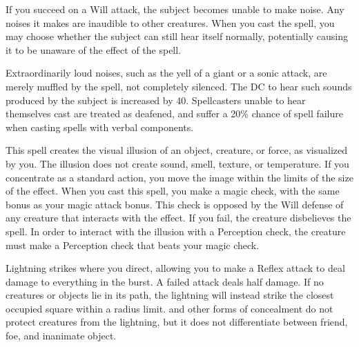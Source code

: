 \spelldur{\durshort \dismissable}
\spelleffect If you succeed on a Will attack, the subject becomes unable to make noise. Any noises it makes are inaudible to other creatures. When you cast the spell, you may choose whether the subject can still hear itself normally, potentially causing it to be unaware of the effect of the spell.

Extraordinarily loud noises, such as the yell of a giant or a sonic attack, are merely muffled by the spell, not completely silenced. The DC to hear such sounds produced by the subject is increased by 40.
\spellnotes Spellcasters unable to hear themselves cast are treated as deafened, and suffer a 20\% chance of spell failure when casting spells with verbal components.

\spelldur{\durshort}
\spelleffect This spell creates the visual illusion of an object, creature, or force, as visualized by you. The illusion does not create sound, smell, texture, or temperature. If you concentrate as a standard action, you move the image within the limits of the size of the effect.
\spellnotes When you cast this spell, you make a magic check, with the same bonus as your magic attack bonus. This check is opposed by the Will defense of any creature that interacts with the effect. If you fail, the creature disbelieves the spell. In order to interact with the illusion with a Perception check, the creature must make a Perception check that beats your magic check.

\spelleffect Lightning strikes where you direct, allowing you to make a Reflex attack to deal damage to everything in the burst. A failed attack deals half damage. If no creatures or objects lie in its path, the lightning will instead strike the closest occupied square within a \areamed radius limit.
\spellnotes {} and other forms of concealment do not protect creatures from the lightning, but it does not differentiate between friend, foe, and inanimate object.

